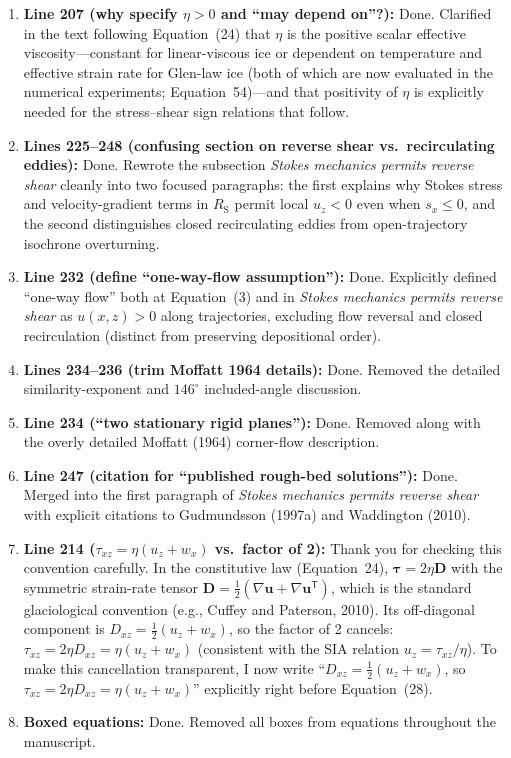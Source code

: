 \documentclass[11pt]{article}
\begin{document}
\begin{enumerate}
  \item \textbf{Line 207 (why specify \(\eta>0\) and ``may depend on''?):} \textcolor{responseblue}{Done. Clarified in the text following Equation~(24) that \(\eta\) is the positive scalar effective viscosity---constant for linear-viscous ice or dependent on temperature and effective strain rate for Glen-law ice (both of which are now evaluated in the numerical experiments; Equation~54)---and that positivity of \(\eta\) is explicitly needed for the stress--shear sign relations that follow.}
  \item \textbf{Lines 225--248 (confusing section on reverse shear vs.\ recirculating eddies):} \textcolor{responseblue}{Done. Rewrote the subsection \emph{Stokes mechanics permits reverse shear} cleanly into two focused paragraphs: the first explains why Stokes stress and velocity-gradient terms in \(R_{\mathrm{S}}\) permit local \(u_z<0\) even when \(s_x\leq 0\), and the second distinguishes closed recirculating eddies from open-trajectory isochrone overturning.}
  \item \textbf{Line 232 (define ``one-way-flow assumption''):} \textcolor{responseblue}{Done. Explicitly defined ``one-way flow'' both at Equation~(3) and in \emph{Stokes mechanics permits reverse shear} as \(u(x,z)>0\) along trajectories, excluding flow reversal and closed recirculation (distinct from preserving depositional order).}
  \item \textbf{Lines 234--236 (trim Moffatt 1964 details):} \textcolor{responseblue}{Done. Removed the detailed similarity-exponent and \(146^{\circ}\) included-angle discussion.}
  \item \textbf{Line 234 (``two stationary rigid planes''):} \textcolor{responseblue}{Done. Removed along with the overly detailed Moffatt (1964) corner-flow description.}
  \item \textbf{Line 247 (citation for ``published rough-bed solutions''):} \textcolor{responseblue}{Done. Merged into the first paragraph of \emph{Stokes mechanics permits reverse shear} with explicit citations to Gudmundsson (1997a) and Waddington (2010).}
  \item \textbf{Line 214 (\(\tau_{xz}=\eta(u_z+w_x)\) vs.\ factor of 2):} \textcolor{responseblue}{Thank you for checking this convention carefully. In the constitutive law (Equation~24), \(\bm{\tau}=2\eta\bm{D}\) with the symmetric strain-rate tensor \(\bm{D}=\frac{1}{2}(\nabla\bm{u}+\nabla\bm{u}^{\mathsf T})\), which is the standard glaciological convention (e.g., Cuffey and Paterson, 2010). Its off-diagonal component is \(D_{xz}=\frac{1}{2}(u_z+w_x)\), so the factor of 2 cancels: \(\tau_{xz}=2\eta D_{xz}=\eta(u_z+w_x)\) (consistent with the SIA relation \(u_z=\tau_{xz}/\eta\)). To make this cancellation transparent, I now write ``\(D_{xz}=\frac{1}{2}(u_z+w_x)\), so \(\tau_{xz}=2\eta D_{xz}=\eta(u_z+w_x)\)'' explicitly right before Equation~(28).}
  \item \textbf{Boxed equations:} \textcolor{responseblue}{Done. Removed all boxes from equations throughout the manuscript.}
\end{enumerate}
\end{document}

